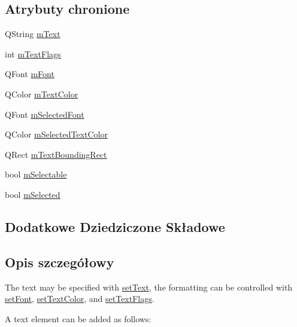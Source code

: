 \subsection*{Atrybuty chronione}
\begin{DoxyCompactItemize}
\item 
Q\+String \hyperlink{class_q_c_p_text_element_a2ef3d8f044b2a0520c90561b3b533028}{m\+Text}
\item 
int \hyperlink{class_q_c_p_text_element_a221eb95ecda1056eb79d56f1230f45d5}{m\+Text\+Flags}
\item 
Q\+Font \hyperlink{class_q_c_p_text_element_a2fef52fa1ec006799102b2956133ba29}{m\+Font}
\item 
Q\+Color \hyperlink{class_q_c_p_text_element_a3685263a99eacd98b180d29adc8e8830}{m\+Text\+Color}
\item 
Q\+Font \hyperlink{class_q_c_p_text_element_a5d242628c9c4beb361b82676c4851c38}{m\+Selected\+Font}
\item 
Q\+Color \hyperlink{class_q_c_p_text_element_ad523a852d47bc97b1af62a4d0dedf2ad}{m\+Selected\+Text\+Color}
\item 
Q\+Rect \hyperlink{class_q_c_p_text_element_a226bb09aae41b1d106f6b00d52def0cb}{m\+Text\+Bounding\+Rect}
\item 
bool \hyperlink{class_q_c_p_text_element_a112e8f9898991fe54f94fcb7effddc2f}{m\+Selectable}
\item 
bool \hyperlink{class_q_c_p_text_element_a7a46eb67459a3c8c80d19aa28b8ae791}{m\+Selected}
\end{DoxyCompactItemize}
\subsection*{Dodatkowe Dziedziczone Składowe}


\subsection{Opis szczegółowy}
The text may be specified with \hyperlink{class_q_c_p_text_element_ac44b81e69e719b879eb2feecb33557e2}{set\+Text}, the formatting can be controlled with \hyperlink{class_q_c_p_text_element_a09b3241769528fa87cb4bf35c97defad}{set\+Font}, \hyperlink{class_q_c_p_text_element_a4f3b8361c3ffb3f84346954929ce93ba}{set\+Text\+Color}, and \hyperlink{class_q_c_p_text_element_ab908f437f552020888a3ad8cf8242605}{set\+Text\+Flags}.

A text element can be added as follows\+: 
\begin{DoxyCodeInclude}
\end{DoxyCodeInclude}


